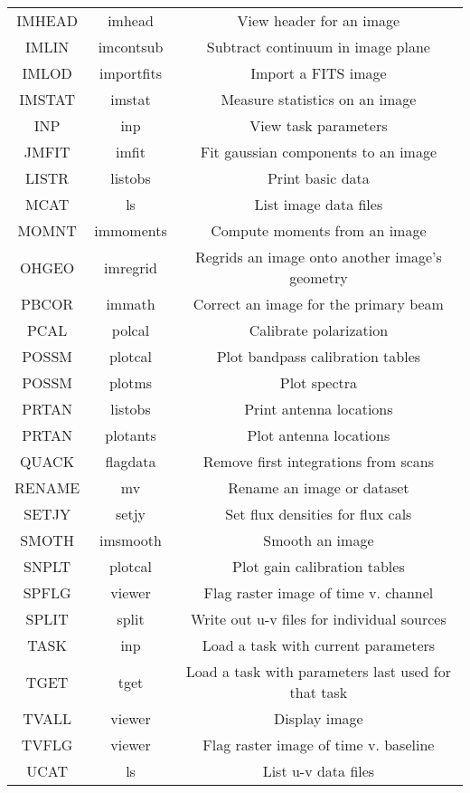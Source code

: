 \begin{table}[ht]
\begin{center}
\begin{tabular}{|c|c|c|}
IMHEAD 	 & imhead 	         & View header for an image\\
IMLIN 	 & imcontsub 	 & Subtract continuum in image plane\\
IMLOD 	 & importfits 	 & Import a FITS image\\
IMSTAT 	 & imstat   	 & Measure statistics on an image\\
INP 	 & inp     	 & View task parameters\\
JMFIT 	 & imfit    	 & Fit gaussian components to an image\\
LISTR 	 & listobs 	 & Print basic data\\
MCAT 	 & ls 	         & List image data files\\
MOMNT 	 & immoments 	 & Compute moments from an image\\
OHGEO 	 & imregrid 	 & Regrids an image onto another image's geometry\\
PBCOR 	 & immath   	 & Correct an image for the primary beam\\
PCAL 	 & polcal 	         & Calibrate polarization\\
POSSM 	 & plotcal 	 & Plot bandpass calibration tables\\
POSSM 	 & plotms    	 & Plot spectra\\
PRTAN 	 & listobs 	 & Print antenna locations\\
PRTAN 	 & plotants 	 & Plot antenna locations\\
QUACK 	 & flagdata 	 & Remove first integrations from scans\\
RENAME 	 & mv 	         & Rename an image or dataset\\
SETJY 	 & setjy 	         & Set flux densities for flux cals\\
SMOTH 	 & imsmooth 	 & Smooth an image\\
SNPLT 	 & plotcal 	 & Plot gain calibration tables\\
SPFLG 	 & viewer   	 & Flag raster image of time v. channel\\
SPLIT 	 & split    	 & Write out u-v files for individual sources\\
TASK 	 & inp     	 & Load a task with current parameters\\
TGET 	 & tget    	 & Load a task with parameters last used for that task\\
TVALL 	 & viewer  	 & Display image\\
TVFLG 	 & viewer 	         & Flag raster image of time v. baseline\\
UCAT 	 & ls      	 & List u-v data files\\

\end{tabular}
\end{center}
\end{table}
